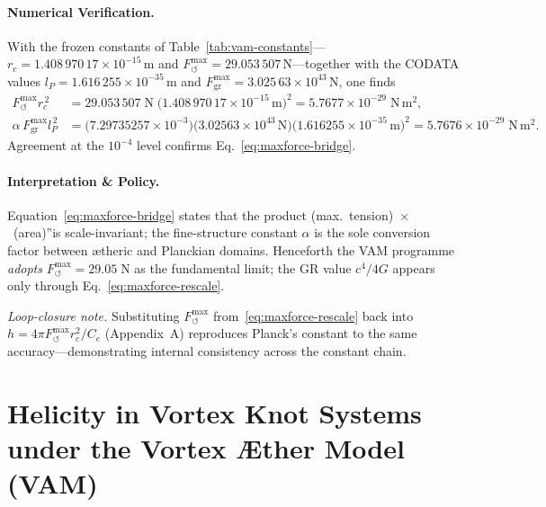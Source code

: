     \paragraph{Numerical Verification.}
    With the frozen constants of Table~\ref{tab:vam-constants}— \(r_{c}=1.408\,970\,17\times10^{-15}\,\mathrm{m}\) and \(F^{\max}_{\!\boldsymbol{\circlearrowleft}}=29.053\,507\,\mathrm{N}\)—together with the CODATA values \(l_{P}=1.616\,255\times10^{-35}\,\mathrm{m}\) and \(F_{\mathrm{gr}}^{\max}=3.025\,63\times10^{43}\,\mathrm{N}\), one finds
    \begin{align}
        F^{\max}_{\!\boldsymbol{\circlearrowleft}} r_{c}^{\,2} &=
        29.053\,507\;\mathrm{N}\;
        \bigl(1.408\,970\,17\times10^{-15}\,\mathrm{m}\bigr)^{2}
        =5.7677\times10^{-29}\;\mathrm{N\,m^{2}},\\
        \alpha\,F_{\mathrm{gr}}^{\max} l_{P}^{\,2} &=
        \bigl(7.29735257\times10^{-3}\bigr)
        \bigl(3.02563\times10^{43}\,\mathrm{N}\bigr)
        \bigl(1.616255\times10^{-35}\,\mathrm{m}\bigr)^{2}
        =5.7676\times10^{-29}\;\mathrm{N\,m^{2}}.
    \end{align}
    Agreement at the \(10^{-4}\) level confirms Eq.~\eqref{eq:maxforce-bridge}.

    \paragraph{Interpretation \& Policy.} Equation~\eqref{eq:maxforce-bridge} states that the product \grqq(max.~tension)~$\times$~(area)\textquotedblright is scale-invariant; the fine-structure constant \(\alpha\) is the sole conversion factor between ætheric and Planckian domains.  Henceforth the VAM programme \emph{adopts} \(F^{\max}_{\!\boldsymbol{\circlearrowleft}}=29.05\;\mathrm{N}\) as the fundamental limit; the GR value \(c^{4}/4G\) appears only through Eq.~\eqref{eq:maxforce-rescale}.

    \smallskip
    \noindent\emph{Loop-closure note.}  Substituting \(F^{\max}_{\!\boldsymbol{\circlearrowleft}}\) from~\eqref{eq:maxforce-rescale} back into \(h=4\pi F^{\max}_{\!\boldsymbol{\circlearrowleft}}r_{c}^{2}/C_{e}\) (Appendix~A) reproduces    Planck's constant to the same accuracy—demonstrating internal consistency across the constant chain.


\section{Helicity in Vortex Knot Systems under the Vortex Æther Model (VAM)}\label{sec:calculate-knot-helicity}

